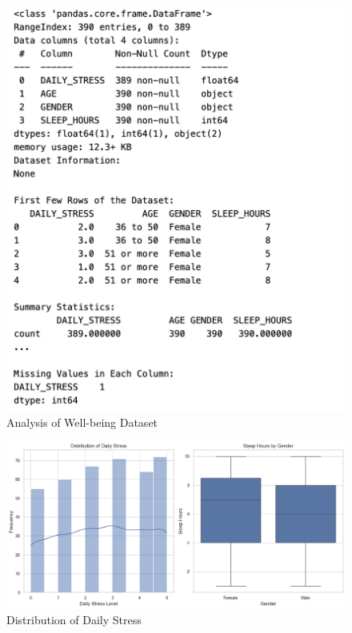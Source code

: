 \documentclass[runningheads]{llncs}
\begin{document}
\begin{enumerate}
\begin{figure}
    \centering
    \includegraphics[width=.8\linewidth]{eda4.png}
    \caption{Analysis of Well-being Dataset} 
    \label{fig:enter-label}
\end{figure}

\begin{figure}
    \centering
    \includegraphics[width=1.0\linewidth]{eda5.png}
    \caption{Distribution of Daily Stress} 
    \label{fig:enter-label}
\end{figure}


\end{enumerate}
\end{document}
